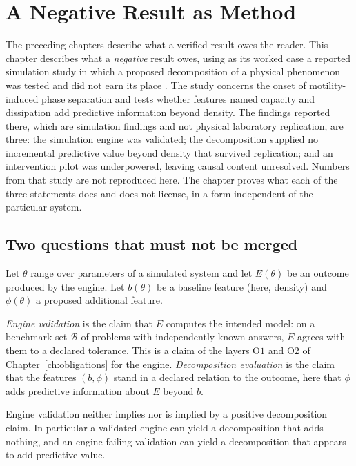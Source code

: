 \chapter{A Negative Result as Method}
\label{ch:negative}

The preceding chapters describe what a verified result owes the reader. This chapter describes what a \emph{negative} result owes, using as its worked case a reported simulation study in which a proposed decomposition of a physical phenomenon was tested and did not earn its place \cite{flyxion-mips}. The study concerns the onset of motility-induced phase separation and tests whether features named capacity and dissipation add predictive information beyond density. The findings reported there, which are simulation findings and not physical laboratory replication, are three: the simulation engine was validated; the decomposition supplied no incremental predictive value beyond density that survived replication; and an intervention pilot was underpowered, leaving causal content unresolved. Numbers from that study are not reproduced here. The chapter proves what each of the three statements does and does not license, in a form independent of the particular system.

\section{Two questions that must not be merged}

Let $\theta$ range over parameters of a simulated system and let $E(\theta)$ be an outcome produced by the engine. Let $b(\theta)$ be a baseline feature (here, density) and $\phi(\theta)$ a proposed additional feature.

\begin{definition}
\label{def:two-questions}
\emph{Engine validation} is the claim that $E$ computes the intended model: on a benchmark set $\mathcal B$ of problems with independently known answers, $E$ agrees with them to a declared tolerance. This is a claim of the layers $\mathrm O1$ and $\mathrm O2$ of Chapter~\ref{ch:obligations} for the engine. \emph{Decomposition evaluation} is the claim that the features $(b,\phi)$ stand in a declared relation to the outcome, here that $\phi$ adds predictive information about $E$ beyond $b$.
\end{definition}

\begin{proposition}
\label{prop:two-q-indep}
Engine validation neither implies nor is implied by a positive decomposition claim. In particular a validated engine can yield a decomposition that adds nothing, and an engine failing validation can yield a decomposition that appears to add predictive value.
\end{proposition}

